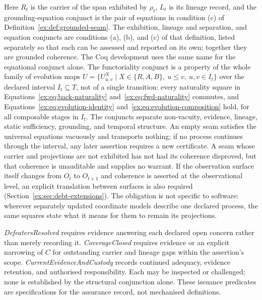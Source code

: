 \documentclass[11pt]{article}
\theoremstyle{definition}
\begin{document}
Here $R_t$ is the carrier of the span exhibited by $\rho_t$, $L_t$ is its lineage record, and the grounding-equation conjunct is the pair of equations in condition (c) of Definition~\ref{ex:def:grounded-seam}. The exhibition, lineage and separation, and equation conjuncts are conditions (a), (b), and (c) of that definition, listed separately so that each can be assessed and reported on its own; together they are grounded coherence. The Coq development uses the same name for the equational conjunct alone. The functoriality conjunct is a property of the whole family of evolution maps $U=\{U^X_{u,v}\mid X\in\{R,A,B\},\ u\leq v,\ u,v\in I_t\}$ over the declared interval $I_t\subseteq T$, not of a single transition: every naturality square in Equations~\eqref{ex:eq:back-naturality} and~\eqref{ex:eq:fwd-naturality} commutes, and Equations~\eqref{ex:eq:evolution-identity} and~\eqref{ex:eq:evolution-composition} hold, for all composable stages in $I_t$. The conjuncts separate non-vacuity, evidence, lineage, static sufficiency, grounding, and temporal structure. An empty seam satisfies the universal equations vacuously and transports nothing; if no process continues through the interval, any later assertion requires a new certificate. A seam whose carrier and projections are not exhibited has not had its coherence disproved, but that coherence is unauditable and supplies no warrant. If the observation surface itself changes from $O_t$ to $O_{t+1}$ and coherence is asserted at the observational level, an explicit translation between surfaces is also required (Section~\ref{ex:sec:debt-extensions}). The obligation is not specific to software: wherever separately updated coordinate models describe one declared process, the same squares state what it means for them to remain its projections.

\emph{DefeatersResolved} requires evidence answering each declared open concern rather than merely recording it. \emph{CoverageClosed} requires evidence or an explicit narrowing of $C$ for outstanding carrier and lineage gaps within the assertion's scope. \emph{CurrentEvidenceAndCustody} records continued adequacy, evidence retention, and authorised responsibility. Each may be inspected or challenged; none is established by the structural conjunction alone. These issuance predicates are specifications for the assurance record, not mechanised definitions.
\end{document}
